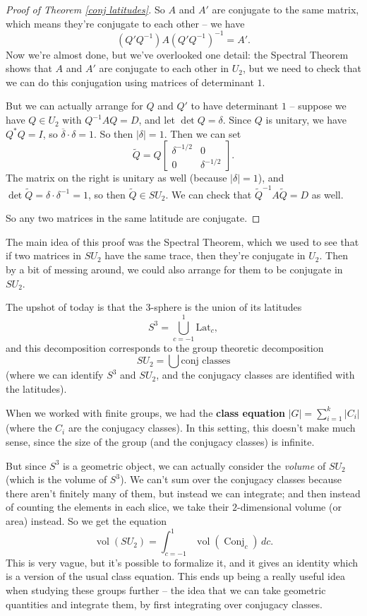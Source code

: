 \begin{proof}[Proof of Theorem \ref{conj latitudes}]
So $A$ and $A'$ are conjugate to the same matrix, which means they're conjugate to each other -- we have \[(Q'Q^{-1})A(Q'Q^{-1})^{-1} = A'.\] Now we're almost done, but we've overlooked one detail: the Spectral Theorem shows that $A$ and $A'$ are conjugate to each other in $U_2$, but we need to check that we can do this conjugation using matrices of determinant $1$. 

But we can actually arrange for $Q$ and $Q'$ to have determinant $1$ -- suppose we have $Q \in U_2$ with $Q^{-1}AQ = D$, and let $\det Q = \delta$. Since $Q$ is unitary, we have $Q^*Q = I$, so $\overline{\delta} \cdot \delta = 1$. So then $|\delta| = 1$. Then we can set \[\tilde{Q} = Q\begin{bmatrix} \delta^{-1/2} & 0 \\ 0 & \delta^{-1/2}\end{bmatrix}.\] The matrix on the right is unitary as well (because $|\delta| = 1$), and $\det \tilde{Q} = \delta \cdot \delta^{-1} = 1$, so then $\tilde{Q} \in SU_2$. We can check that $\tilde{Q}^{-1}A\tilde{Q} = D$ as well.

So any two matrices in the same latitude are conjugate. 
\end{proof}

\begin{note}
The main idea of this proof was the Spectral Theorem, which we used to see that if two matrices in $SU_2$ have the same trace, then they're conjugate in $U_2$. Then by a bit of messing around, we could also arrange for them to be conjugate in $SU_2$. 
\end{note}

The upshot of today is that the $3$-sphere is the union of its latitudes \[ S^3 = \bigcup_{c=-1}^1 \text{Lat}_c, \] 
and this decomposition corresponds to the group theoretic decomposition \[SU_2 = \bigcup \text{conj classes}\] (where we can identify $S^3$ and $SU_2$, and the conjugacy classes are identified with the latitudes). 

When we worked with finite groups, we had the \textbf{class equation} $|G| = \sum_{i = 1}^k |C_i|$ (where the $C_i$ are the conjugacy classes). In this setting, this doesn't make much sense, since the size of the group (and the conjugacy classes) is infinite. 

But since $S^3$ is a geometric object, we can actually consider the \emph{volume} of $SU_2$ (which is the volume of $S^3$). We can't sum over the conjugacy classes because there aren't finitely many of them, but instead we can integrate; and then instead of counting the elements in each slice, we take their $2$-dimensional volume (or area) instead. So we get the equation \[\operatorname{vol}(SU_2) = \int_{c = -1}^1 \operatorname{vol}(\operatorname{Conj}_c) \, dc.\] This is very vague, but it's possible to formalize it, and it gives an identity which is a version of the usual class equation. This ends up being a really useful idea when studying these groups further -- the idea that we can take geometric quantities and integrate them, by first integrating over conjugacy classes. 

\newpage